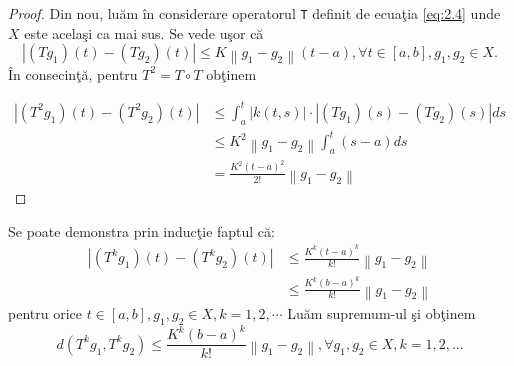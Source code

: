 \documentclass[a4paper,12pt,oneside]{report}
\begin{document}
\begin{proof}

Din nou, lu\u{a}m \^{i}n considerare operatorul \texttt{T} definit de ecua\c{t}ia \ref{eq:2.4} unde \(X\) este acela\c{s}i ca mai sus. Se vede u\c{s}or c\u{a}
\begin{displaymath}
\left | \left ( Tg_{1} \right )\left ( t \right )  - \left ( Tg_{2} \right )\left ( t \right )\right |\leq K\left \| g_{1}  - g_{2}\right \|\left ( t-a \right ), \forall t\in \left [ a,b \right ], g_{1}, g_{2} \in X.
\end{displaymath}
\^{I}n consecin\c{t}\u{a}, pentru \(T^{2} = T \circ T\) ob\c{t}inem


\begin{equation} \nonumber
    \begin{split}
        \left | \left ( T^{2}g_{1} \right )\left ( t \right )  - \left ( T^{2}g_{2} \right )\left ( t \right )\right |& \leq \int_{a}^{t}\left | k\left ( t,s \right ) \right |\cdot \left | \left ( Tg_{1} \right )\left ( s \right ) - \left ( Tg_{2} \right )\left ( s \right ) \right |ds \\ & \leq K^{2}\left \| g_{1} - g_{2} \right \|\int_{a}^{t}\left ( s-a \right )ds \\& = \frac{K^{2}\left ( t-a \right )^{2}}{2!}\left \| g_{1} - g_{2} \right \|
    \end{split}
\end{equation}

\end{proof}

\noindent Se poate demonstra prin induc\c{t}ie faptul c\u{a}:
\begin{equation}\nonumber
    \begin{split}
        \left | \left ( T^{k}g_{1} \right ) \left ( t \right ) - \left ( T^{k}g_{2} \right )\left ( t \right )\right | & \leq \frac{K^{k}\left ( t-a \right )^{k}}{k!}\left \| g_{1} - g_{2} \right \| \\ & \leq \frac{K^{k}\left ( b-a \right )^{k}}{k!}\left \| g_{1}- g_{2} \right \|
    \end{split}
\end{equation}
pentru orice  \(t\in \left [ a,b \right ], g_{1}, g_{2} \in X, k = 1,2,\cdots\)
\noindent
Lu\u{a}m supremum-ul \c{s}i ob\c{t}inem
\begin{displaymath}
d\left ( T^{k}g_{1} , T^{k}g_{2}\right ) \leq \frac{K^{k}\left ( b - a  \right )^{k}}{k!}\left \| g_{1} - g_{2}\right \|, \forall g_{1}, g_{2} \in X, k = 1,2,... \label{eq:2.5} \tag{2.5}
\end{displaymath}
\end{document}

